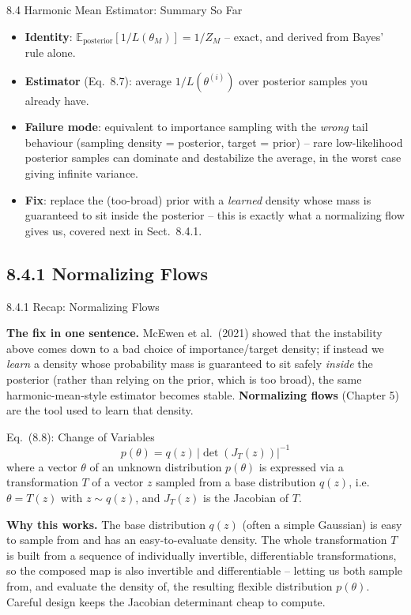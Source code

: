 \documentclass[aspectratio=169,10pt]{beamer}
\begin{document}
\begin{frame}{8.4 Harmonic Mean Estimator: Summary So Far}
\begin{itemize}
  \item \textbf{Identity}: $\mathbb{E}_{\text{posterior}}[1/L(\theta_M)] = 1/Z_M$ -- exact, and derived from Bayes' rule alone.
  \item \textbf{Estimator} (Eq.\ 8.7): average $1/L(\theta^{(i)})$ over posterior samples you already have.
  \item \textbf{Failure mode}: equivalent to importance sampling with the \emph{wrong} tail behaviour (sampling density = posterior, target = prior) -- rare low-likelihood posterior samples can dominate and destabilize the average, in the worst case giving infinite variance.
  \item \textbf{Fix}: replace the (too-broad) prior with a \emph{learned} density whose mass is guaranteed to sit inside the posterior -- this is exactly what a normalizing flow gives us, covered next in Sect.\ 8.4.1.
\end{itemize}
\end{frame}

\subsection{8.4.1 Normalizing Flows}

\begin{frame}[allowframebreaks]{8.4.1 Recap: Normalizing Flows}

\textbf{The fix in one sentence.} McEwen et al.\ (2021) showed that the instability above comes down to a bad choice of importance/target density; if instead we \emph{learn} a density whose probability mass is guaranteed to sit safely \emph{inside} the posterior (rather than relying on the prior, which is too broad), the same harmonic-mean-style estimator becomes stable. \textbf{Normalizing flows} (Chapter 5) are the tool used to learn that density.

\begin{block}{Eq.\ (8.8): Change of Variables}
\[
p(\theta) = q(z)\,\big|\det(J_T(z))\big|^{-1}
\]
where a vector $\theta$ of an unknown distribution $p(\theta)$ is expressed via a transformation $T$ of a vector $z$ sampled from a base distribution $q(z)$, i.e.\ $\theta = T(z)$ with $z \sim q(z)$, and $J_T(z)$ is the Jacobian of $T$.
\end{block}

\framebreak

\textbf{Why this works.} The base distribution $q(z)$ (often a simple Gaussian) is easy to sample from and has an easy-to-evaluate density. The whole transformation $T$ is built from a sequence of individually invertible, differentiable transformations, so the composed map is also invertible and differentiable -- letting us both sample from, and evaluate the density of, the resulting flexible distribution $p(\theta)$. Careful design keeps the Jacobian determinant cheap to compute.

\end{frame}
\end{document}
